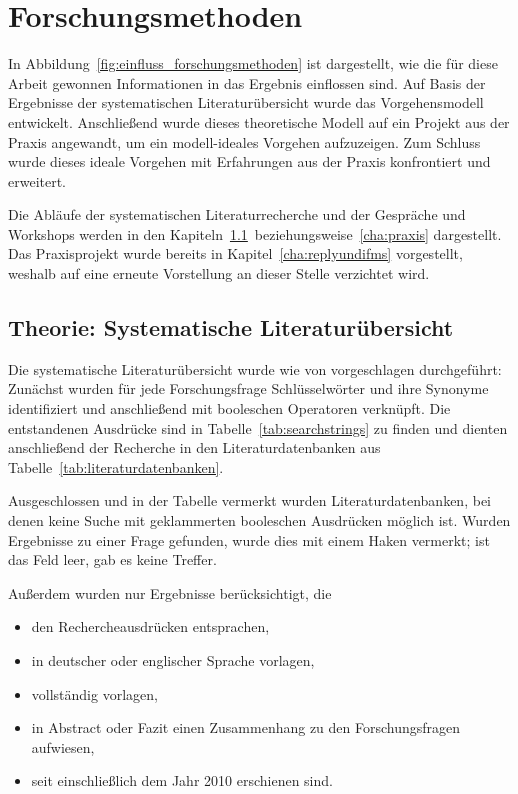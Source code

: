 \section{Forschungsmethoden}
\label{cha:method}
In Abbildung~\ref{fig:einfluss_forschungsmethoden} ist dargestellt, wie die für diese Arbeit gewonnen Informationen in das Ergebnis einflossen sind. Auf Basis der 
Ergebnisse der systematischen Literaturübersicht wurde das Vorgehensmodell 
entwickelt. Anschließend wurde dieses theoretische Modell auf ein Projekt aus 
der Praxis angewandt, um ein modell-ideales Vorgehen aufzuzeigen. Zum Schluss 
wurde dieses ideale Vorgehen mit Erfahrungen aus der Praxis konfrontiert und 
erweitert.

Die Abläufe der systematischen Literaturrecherche und der Gespräche und 
Workshops werden in den 
Kapiteln~\ref{cha:literaturuebersicht}~beziehungsweise~\ref{cha:praxis} 
dargestellt. Das Praxisprojekt wurde bereits in Kapitel~\ref{cha:replyundifms} 
vorgestellt, weshalb auf eine erneute Vorstellung an dieser Stelle verzichtet 
wird.
\subsection{Theorie: Systematische Literaturübersicht}
\label{cha:literaturuebersicht}
Die systematische Literaturübersicht wurde wie von  
vorgeschlagen durchgeführt: Zunächst wurden für jede Forschungsfrage 
Schlüsselwörter und ihre Synonyme identifiziert und anschließend mit booleschen 
Operatoren verknüpft. Die entstandenen Ausdrücke sind in 
Tabelle~\ref{tab:searchstrings} zu finden und dienten anschließend der 
Recherche in den Literaturdatenbanken aus Tabelle~\ref{tab:literaturdatenbanken}.


Ausgeschlossen und in der Tabelle vermerkt wurden Literaturdatenbanken, bei 
denen keine Suche mit geklammerten booleschen Ausdrücken möglich ist. Wurden 
Ergebnisse zu einer Frage gefunden, wurde dies mit einem Haken vermerkt; ist 
das Feld leer, gab es keine Treffer.



Außerdem wurden nur Ergebnisse berücksichtigt, die
\begin{itemize}
	\item den Rechercheausdrücken entsprachen,
	\item in deutscher oder englischer Sprache vorlagen,
	\item vollständig vorlagen,
	\item in Abstract oder Fazit einen Zusammenhang zu den Forschungsfragen
aufwiesen,
	\item seit einschließlich dem Jahr 2010 erschienen sind.
\end{itemize}
\begin{comment}
In diesem Kapitel erläutern Sie ihre Forschungsmethode unter Verwendung von
entsprechenden Quellen.
Begründen Sie auch, warum Sie sich für diese Forschungsmethode entschieden
haben
und warum sie geeignet ist, die vorliegende Forschungsfrage zu beantworten.
\end{comment}


